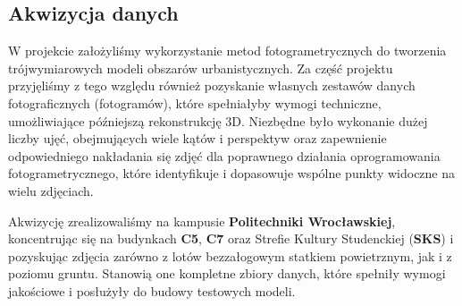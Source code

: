\subsection{Akwizycja danych}
W projekcie założyliśmy wykorzystanie metod fotogrametrycznych do tworzenia trójwymiarowych modeli 
obszarów urbanistycznych. Za część projektu przyjęliśmy z tego względu również pozyskanie własnych zestawów 
danych fotograficznych (fotogramów), które spełniałyby wymogi techniczne, umożliwiające późniejszą 
rekonstrukcję 3D. Niezbędne było wykonanie dużej liczby ujęć, obejmujących wiele kątów i perspektyw oraz 
zapewnienie odpowiedniego nakładania się zdjęć dla poprawnego działania oprogramowania fotogrametrycznego, 
które identyfikuje i dopasowuje wspólne punkty widoczne na wielu zdjęciach.

Akwizycję zrealizowaliśmy na kampusie \textbf{Politechniki Wrocławskiej}, koncentrując się na budynkach \textbf{C5}, \textbf{C7} oraz 
Strefie Kultury Studenckiej (\textbf{SKS}) i pozyskując zdjęcia zarówno z lotów bezzałogowym statkiem powietrznym, 
jak i z poziomu gruntu. Stanowią one kompletne zbiory danych, które spełniły wymogi jakościowe 
i posłużyły do budowy testowych modeli. 

